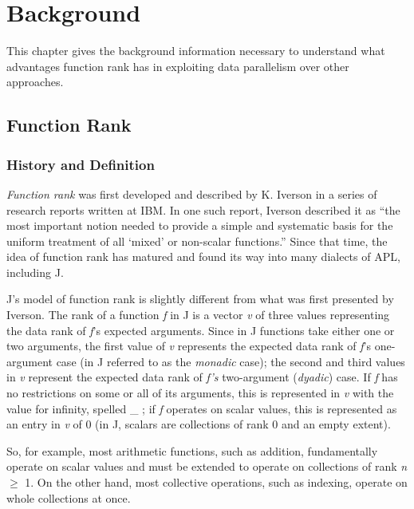 \chapter{Background}
\label{back}

This chapter gives the background information necessary to understand what advantages function rank has in exploiting data parallelism over other approaches.

\section{Function Rank}
\subsection{History and Definition}
\textit{Function rank} was first developed and described by K. Iverson in a series of research reports written at IBM. %
In one such report, Iverson described it as 
``the most important notion needed to provide a simple and systematic basis for the uniform treatment of all `mixed' or non-scalar functions.''\cite{rapl} %
Since that time, the idea of function rank has matured and found its way into many dialects of APL, including J.

J's model of function rank is slightly different from what was first presented by Iverson. \cite{rankanduni} \cite{jvocab}
The rank of a function \textit{f} in J is a vector \textit{v} of three values representing the data rank of \textit{f}'s expected arguments.
Since in J functions take either one or two arguments, the first value of \textit{v} represents the expected data rank of \textit{f}'s one-argument case (in J referred to as the \textit{monadic} case);
the second and third values in \textit{v} represent the expected data rank of \textit{f's} two-argument (\textit{dyadic}) case.
If \textit{f} has no restrictions on some or all of its arguments, this is represented in \textit{v} with the value for infinity, spelled \ttfamily \_ \normalfont ;
if \textit{f} operates on scalar values, this is represented as an entry in \textit{v} of 0 (in J, scalars are collections of rank 0 and an empty extent). %

So, for example, most arithmetic functions, such as addition, fundamentally operate on scalar values and must be extended to operate on collections of rank \textit{n} $\ge$ 1.
On the other hand, most collective operations, such as indexing, operate on whole collections at once.

